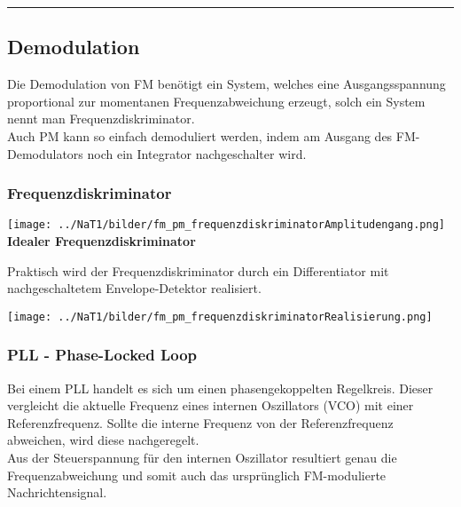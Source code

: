 \hrule
\subsection{Demodulation}
Die Demodulation von FM benötigt ein System, welches eine Ausgangsspannung proportional zur
momentanen Frequenzabweichung erzeugt, solch ein System nennt man Frequenzdiskriminator. \\
Auch PM kann so einfach demoduliert werden, indem am Ausgang des FM-Demodulators noch ein
Integrator nachgeschalter wird.

\subsubsection{Frequenzdiskriminator}
\begin{minipage}[t][3cm][c]{6cm}	
	\begin{center}
  		\texttt{[image: ../NaT1/bilder/fm\_pm\_frequenzdiskriminatorAmplitudengang.png]} \\
  		\textbf{Idealer Frequenzdiskriminator}
	\end{center}
\end{minipage}
\begin{minipage}[t][3cm][c]{6cm} 
	Praktisch wird der Frequenzdiskriminator durch ein Differentiator mit nachgeschaltetem
	Envelope-Detektor realisiert.
\end{minipage}
\begin{minipage}[t][3cm][c]{6cm} 
	\begin{center}
		\texttt{[image: ../NaT1/bilder/fm\_pm\_frequenzdiskriminatorRealisierung.png]} \\ 
	\end{center}
\end{minipage}

\subsubsection{PLL - Phase-Locked Loop}
Bei einem PLL handelt es sich um einen phasengekoppelten Regelkreis. Dieser vergleicht die
aktuelle Frequenz eines internen Oszillators (VCO) mit einer Referenzfrequenz. Sollte die
interne Frequenz von der Referenzfrequenz abweichen, wird diese nachgeregelt. \\
Aus der Steuerspannung für den internen Oszillator resultiert genau die Frequenzabweichung und
somit auch das ursprünglich FM-modulierte Nachrichtensignal.\\

